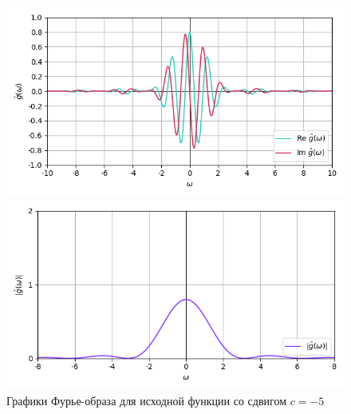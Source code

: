 \documentclass[a4paper]{article}
\begin{document}
\begin{figure}[H]
    \begin{minipage}{0.5\textwidth}
        \centering \includegraphics[width=\textwidth]{sources/6_complex/fourier_1.png}
    \end{minipage}\hfill
    \begin{minipage}{0.5\textwidth}
        \centering \includegraphics[width=\textwidth]{sources/6_complex/abs_1.png}
    \end{minipage}
    \caption{Графики Фурье-образа для исходной функции со сдвигом $c = -5$} 
\end{figure}
\end{document}
